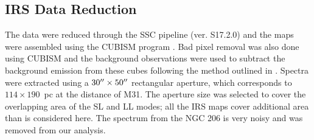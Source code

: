 \subsection{IRS Data Reduction}

The data were reduced through the SSC pipeline (ver. S17.2.0) and the maps were assembled using the CUBISM program \citep{Smith:2007fk}. 
Bad pixel removal was also done using CUBISM and the background observations were used to subtract the background emission from these cubes 
following the method outlined in \citet{Gordon:2008lr}. Spectra were extracted using a $30\hbox{$^{\prime\prime}$}\times50\hbox{$^{\prime\prime}$}$   rectangular aperture,
which corresponds to $114\times190$~pc at the distance of M31.
The aperture size was selected to cover the overlapping area of the SL and LL modes; all the IRS maps cover additional area than is considered here.
The spectrum from the NGC 206 is very noisy and was removed from our analysis. 


